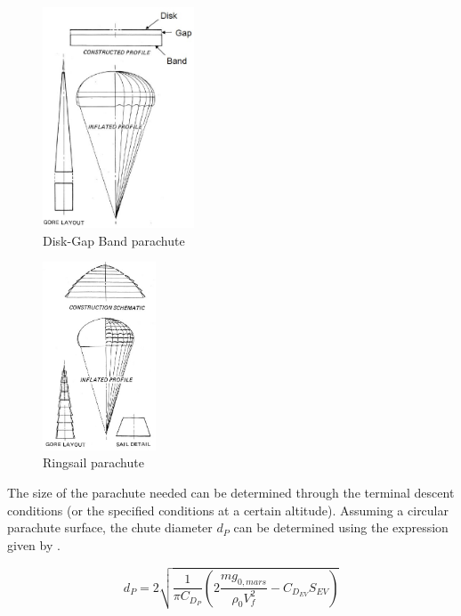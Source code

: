 \begin{figure}[!ht]
\centering
\includegraphics[width=0.4\textwidth]{figures/entry_descent/dgb_mooij2013para.jpg}
\caption{Disk-Gap Band parachute \cite{ewing1978}}
\label{fig:dgb_mooij2013para}
\end{figure}

\begin{figure}[!ht]
\centering
\includegraphics[width=0.3\textwidth]{figures/entry_descent/ringsail_mooij2013para.jpg}
\caption{Ringsail parachute \cite{ewing1978}}
\label{fig:ringsail_mooij2013para}
\end{figure}

The size of the parachute needed can be determined through the terminal descent conditions (or the specified conditions at a certain altitude). Assuming a circular parachute surface, the chute diameter $d_{P}$ can be determined using the expression given by .

\begin{equation}\label{eq:chutediam}
d_{P}=2\sqrt{\dfrac{1}{\pi C_{D_{P}}}\left(2\dfrac{mg_{0,mars}}{\rho_{0}V_{f}^{2}}-C_{D_{EV}}S_{EV}\right)}
\end{equation}


